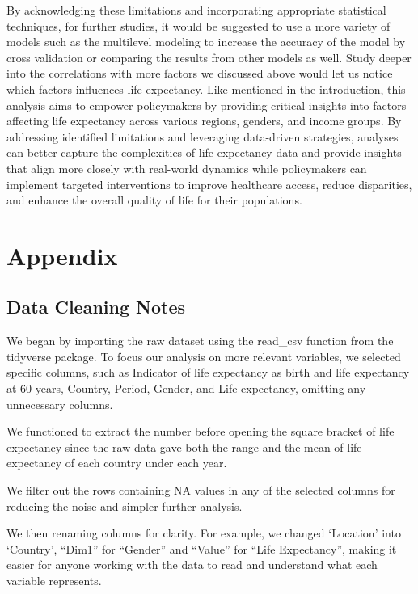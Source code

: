\documentclass[
  letterpaper,
  DIV=11,
  numbers=noendperiod]{scrartcl}
\begin{document}
By acknowledging these limitations and incorporating appropriate
statistical techniques, for further studies, it would be suggested to
use a more variety of models such as the multilevel modeling to increase
the accuracy of the model by cross validation or comparing the results
from other models as well. Study deeper into the correlations with more
factors we discussed above would let us notice which factors influences
life expectancy. Like mentioned in the introduction, this analysis aims
to empower policymakers by providing critical insights into factors
affecting life expectancy across various regions, genders, and income
groups. By addressing identified limitations and leveraging data-driven
strategies, analyses can better capture the complexities of life
expectancy data and provide insights that align more closely with
real-world dynamics while policymakers can implement targeted
interventions to improve healthcare access, reduce disparities, and
enhance the overall quality of life for their populations.

\newpage

\appendix

\section{Appendix}\label{sec-appx}

\subsection{Data Cleaning Notes}\label{data-cleaning-notes}

We began by importing the raw dataset using the read\_csv function from
the tidyverse package. To focus our analysis on more relevant variables,
we selected specific columns, such as Indicator of life expectancy as
birth and life expectancy at 60 years, Country, Period, Gender, and Life
expectancy, omitting any unnecessary columns.

We functioned to extract the number before opening the square bracket of
life expectancy since the raw data gave both the range and the mean of
life expectancy of each country under each year.

We filter out the rows containing NA values in any of the selected
columns for reducing the noise and simpler further analysis.

We then renaming columns for clarity. For example, we changed `Location'
into `Country', ``Dim1'' for ``Gender'' and ``Value'' for ``Life
Expectancy'', making it easier for anyone working with the data to read
and understand what each variable represents.
\end{document}
